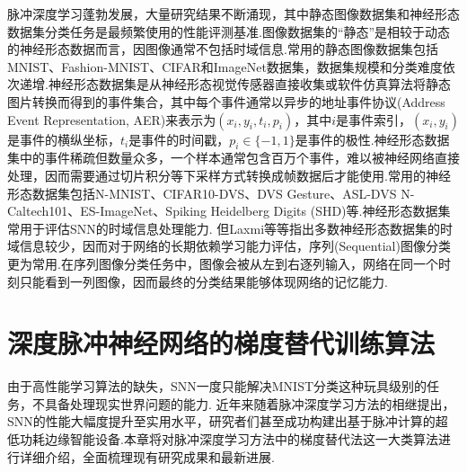 \documentclass{SCIS2020cn}
\begin{document}
脉冲深度学习蓬勃发展，大量研究结果不断涌现，其中静态图像数据集和神经形态数据集分类任务是最频繁使用的性能评测基准.图像数据集的“静态”是相较于动态的神经形态数据而言，因图像通常不包括时域信息.常用的静态图像数据集包括MNIST\cite{MNIST}、Fashion-MNIST\cite{FMNIST}、CIFAR\cite{CIFAR10}和ImageNet\cite{russakovsky2015imagenet}数据集，数据集规模和分类难度依次递增.神经形态数据集是从神经形态视觉传感器直接收集或软件仿真算法将静态图片转换而得到的事件集合，其中每个事件通常以异步的地址事件协议(Address Event Representation, AER)来表示为$(x_{i},y_{i},t_{i},p_{i})$，其中$i$是事件索引，$(x_{i},y_{i})$是事件的横纵坐标，$t_{i}$是事件的时间戳，$p_{i} \in \{-1, 1\}$是事件的极性.神经形态数据集中的事件稀疏但数量众多，一个样本通常包含百万个事件，难以被神经网络直接处理，因而需要通过切片积分等下采样方式转换成帧数据后才能使用\cite{wu2018STBP, fang2021incorporating, doi:10.1126/sciadv.adi1480}.常用的神经形态数据集包括N-MNIST\cite{10.3389/fnins.2015.00437}、CIFAR10-DVS\cite{10.3389/fnins.2017.00309}、DVS Gesture\cite{amir2017low}、ASL-DVS\cite{Bi_2019_ICCV} N-Caltech101\cite{10.3389/fnins.2015.00437}、ES-ImageNet\cite{10.3389/fnins.2021.726582}、Spiking Heidelberg Digits (SHD)\cite{shd}等.神经形态数据集常用于评估SNN的时域信息处理能力. 但Laxmi等\cite{10.3389/fnins.2021.608567}等指出多数神经形态数据集的时域信息较少，因而对于网络的长期依赖学习能力评估，序列(Sequential)图像分类更为常用\cite{yin2021accurate, fang2023parallel}.在序列图像分类任务中，图像会被从左到右逐列输入，网络在同一个时刻只能看到一列图像，因而最终的分类结果能够体现网络的记忆能力.



\section{深度脉冲神经网络的梯度替代训练算法}
由于高性能学习算法的缺失，SNN一度只能解决MNIST分类这种玩具级别的任务，不具备处理现实世界问题的能力.
近年来随着脉冲深度学习方法的相继提出，SNN的性能大幅度提升至实用水平，研究者们甚至成功构建出基于脉冲计算的超低功耗边缘智能设备\cite{pei2019towards, Yao2024, Yang2024}.本章将对脉冲深度学习方法中的梯度替代法这一大类算法进行详细介绍，全面梳理现有研究成果和最新进展.
\end{document}
